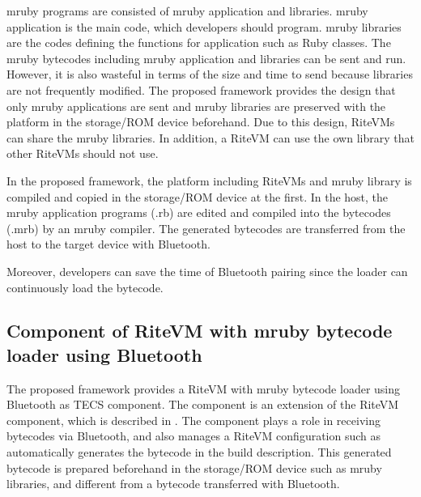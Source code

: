 \documentclass[a4j,12pt,oneside,openany,english]{jsbook}
\begin{document}
mruby programs are consisted of mruby application and libraries.
mruby application is the main code, which developers should program.
mruby libraries are the codes defining the functions for application such as Ruby classes. 
The mruby bytecodes including mruby application and libraries can be sent and run.
However, it is also wasteful in terms of the size and time to send because libraries are not frequently modified. 
The proposed framework provides the design that only mruby applications are sent and mruby libraries are preserved with the platform in the storage/ROM device beforehand.
Due to this design, RiteVMs can share the mruby libraries.
In addition, a RiteVM can use the own library that other RiteVMs should not use.

In the proposed framework, the platform including RiteVMs and mruby library is compiled and copied in the storage/ROM device at the first.
In the host, the mruby application programs (.rb) are edited and compiled into the bytecodes (.mrb) by an mruby compiler.
The generated bytecodes are transferred from the host to the target device with Bluetooth.

Moreover, developers can save the time of Bluetooth pairing since the loader can continuously load the bytecode.


\subsection{Component of RiteVM with mruby bytecode loader using Bluetooth} 

The proposed framework provides a RiteVM with mruby bytecode loader using Bluetooth as TECS component.
The component is an extension of the RiteVM component, which is described in \cite{par:mrubyonTECS}.
The component plays a role in receiving bytecodes via Bluetooth, and also manages a RiteVM configuration such as automatically generates the bytecode in the build description.
This generated bytecode is prepared beforehand in the storage/ROM device such as mruby libraries, and different from a bytecode transferred with Bluetooth.
\end{document}
